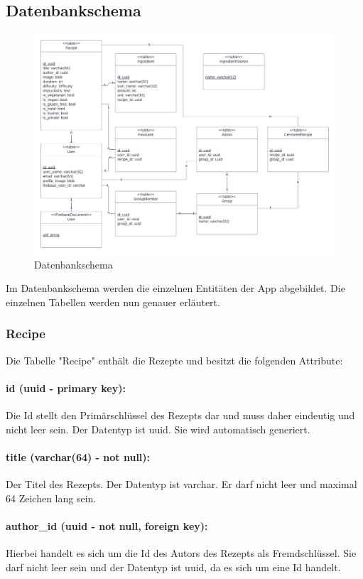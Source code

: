 \documentclass[parskip=full]{scrartcl}
\begin{document}
\subsection{Datenbankschema}
\begin{figure}[htp]
    \centering
    \includegraphics[width = \linewidth]{images/Database/schema.png}
    \caption{Datenbankschema}
\end{figure}
Im Datenbankschema werden die einzelnen Entitäten der App abgebildet. Die einzelnen Tabellen werden nun genauer erläutert.
\newpage
\subsubsection{Recipe}
Die Tabelle "Recipe" enthält die Rezepte und besitzt die folgenden Attribute:
\paragraph{id (uuid - primary key):} Die Id stellt den Primärschlüssel des Rezepts dar und muss daher eindeutig und nicht leer sein. Der Datentyp ist \Gls{uuid}. Sie wird automatisch generiert.
\paragraph{title (varchar(64) - not null):} Der Titel des Rezepts. Der Datentyp ist \Gls{varchar}. Er darf nicht leer und maximal 64 Zeichen lang sein.
\paragraph{author\_id (uuid - not null, foreign key):} Hierbei handelt es sich um die Id des Autors des Rezepts als Fremdschlüssel. Sie darf nicht leer sein und der Datentyp ist \Gls{uuid}, da es sich um eine Id handelt.
\end{document}
